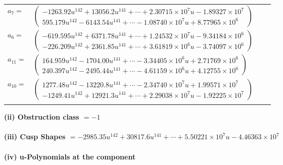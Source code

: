 \documentclass[1p]{elsarticle_modified}
\theoremstyle{definition}
\begin{document}
\begin{tabular}{m{7pt} m{180pt} m{7pt} m{180pt} }
\flushright $a_{7}=$&$\begin{pmatrix}-1263.92 u^{142}+13056.2 u^{141}+\cdots+2.30715\times10^{7} u-1.89327\times10^{7}\\595.179 u^{142}-6143.54 u^{141}+\cdots-1.08740\times10^{7} u+8.77965\times10^{6}\end{pmatrix}$ \\
\flushright $a_{6}=$&$\begin{pmatrix}-619.595 u^{142}+6371.78 u^{141}+\cdots+1.24532\times10^{7} u-9.34184\times10^{6}\\-226.209 u^{142}+2361.85 u^{141}+\cdots+3.61819\times10^{6} u-3.74097\times10^{6}\end{pmatrix}$ \\
\flushright $a_{11}=$&$\begin{pmatrix}164.959 u^{142}-1704.00 u^{141}+\cdots-3.34405\times10^{6} u+2.71769\times10^{6}\\240.397 u^{142}-2495.44 u^{141}+\cdots-4.61159\times10^{6} u+4.12755\times10^{6}\end{pmatrix}$ \\
\flushright $a_{10}=$&$\begin{pmatrix}1277.48 u^{142}-13220.8 u^{141}+\cdots-2.34740\times10^{7} u+1.99571\times10^{7}\\-1249.41 u^{142}+12921.3 u^{141}+\cdots+2.29038\times10^{7} u-1.92225\times10^{7}\end{pmatrix}$\\&\end{tabular}
\flushleft \textbf{(ii) Obstruction class $= -1$}\\~\\
\flushleft \textbf{(iii) Cusp Shapes $= -2985.35 u^{142}+30817.6 u^{141}+\cdots+5.50221\times10^{7} u-4.46363\times10^{7}$}\\~\\
\newpage\renewcommand{\arraystretch}{1}
\flushleft \textbf{(iv) u-Polynomials at the component}\newline \\
\end{document}
